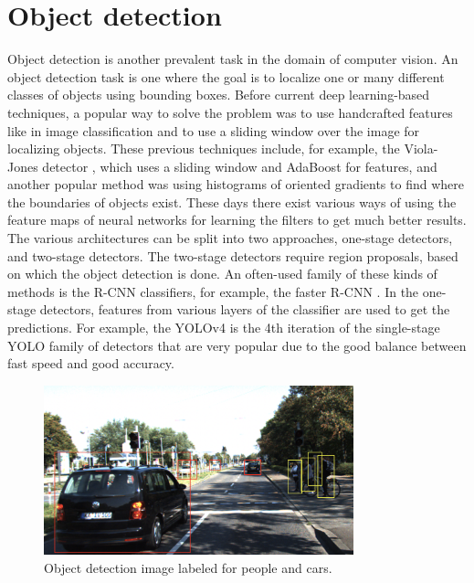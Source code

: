 \chapter{Object detection}
Object detection is another prevalent task in the domain of computer vision.
An object detection task is one where the goal is to localize one or many different classes of objects using bounding boxes.
Before current deep learning-based techniques, a popular way to solve the problem was to use handcrafted features like in image classification and to use a sliding window over the image for localizing objects.
These previous techniques include, for example, the Viola-Jones detector \citep{viola-jones}, which uses a sliding window and AdaBoost for features, and another popular method was using histograms of oriented gradients \citep{hogs} to find where the boundaries of objects exist.
These days there exist various ways of using the feature maps of neural networks for learning the filters to get much better results.
The various architectures can be split into two approaches, one-stage detectors, and two-stage detectors.
The two-stage detectors require region proposals, based on which the object detection is done.
An often-used family of these kinds of methods is the R-CNN classifiers, for example, the faster R-CNN \citep{faster-rcnn}.
In the one-stage detectors, features from various layers of the classifier are used to get the predictions.
For example, the YOLOv4 \citep{yolov4} is the 4th iteration of the single-stage YOLO family of detectors that are very popular due to the good balance between fast speed and good accuracy.

\begin{figure}[h!]
    \centering
    \includegraphics[width=0.8\textwidth]{imgs/obj-det.png}
    \caption{Object detection image labeled for people and cars.}
\end{figure}

